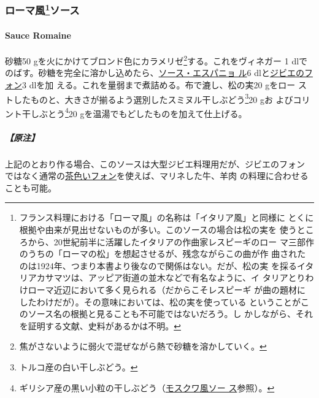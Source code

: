 \begin{recette}
{\subsubsection[ローマ風ソース]{\texorpdfstring{ローマ風\footnote{フランス料理における「ローマ風」の名称は「イタリア風」と同様に
  とくに根拠や由来が見出せないものが多い。このソースの場合は松の実を
  使うところから、20世紀前半に活躍したイタリアの作曲家レスピーギのロー
  マ三部作のうちの「ローマの松」を想起させるが、残念ながらこの曲が作
  曲されたのは1924年、つまり本書より後なので関係はない。だが、松の実
  を採るイタリアカサマツは、アッピア街道の並木などで有名なように、イ
  タリアとりわけローマ近辺において多く見られる（だからこそレスピーギ
  が曲の題材にしたわけだが）。その意味においては、松の実を使っている
  ということがこのソース名の根拠と見ることも不可能ではないだろう。し
  かしながら、それを証明する文献、史料があるかは不明。}ソース}{ローマ風ソース}}\label{ux30edux30fcux30deux98a880ux30bdux30fcux30b9}}

\hypertarget{sauce-romaine}{%
\paragraph{Sauce Romaine}\label{sauce-romaine}}


砂糖50 gを火にかけてブロンド色にカラメリゼ\footnote{焦がさないように弱火で混ぜながら熱で砂糖を溶かしていく。}する。これをヴィネガー
1\undemi{}
dlでのばす。砂糖を完全に溶かし込めたら、\protect\hyperlink{sauce-espagnole}{ソース・エスパニョ
ル}6 dlと\protect\hyperlink{fonds-de-gibier}{ジビエのフォン}3 dlを加
える。これを\troisquarts{}量弱まで煮詰める。布で漉し、松の実20 gをロー
ストしたものと、大きさが揃るよう選別したスミヌル干しぶどう\footnote{トルコ産の白い干しぶどう。}20
gお よびコリント干しぶとう\footnote{ギリシア産の黒い小粒の干しぶどう（\protect\hyperlink{sauce-moscovite}{モスクワ風ソー
  ス}参照）。}20 gを温湯でもどしたものを加えて仕上げる。

\hypertarget{ux539fux6ce8-8}{%
\subparagraph{【原注】}\label{ux539fux6ce8-8}}

上記のとおり作る場合、このソースは大型ジビエ料理用だが、ジビエのフォン
ではなく通常の\protect\hyperlink{fonds-brun}{茶色いフォン}を使えば、マリネした牛、羊肉
の料理に合わせることも可能。


\end{recette}
